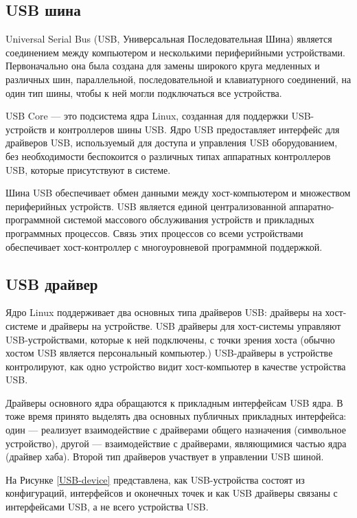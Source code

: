 \subsection{USB шина}
Universal Serial Bus (USB, Универсальная Последовательная Шина) является соединением
между компьютером и несколькими периферийными устройствами. Первоначально она была
создана для замены широкого круга медленных и различных шин, параллельной,
последовательной и клавиатурного соединений, на один тип шины, чтобы к ней могли
подключаться все устройства\cite{Corbet}.\par

USB Core — это подсистема ядра Linux, созданная для поддержки USB-устройств и контроллеров шины USB. Ядро USB предоставляет интерфейс для драйверов USB, используемый для доступа и
управления USB оборудованием, без необходимости беспокоится о различных типах
аппаратных контроллеров USB, которые присутствуют в системе.\par

Шина USB обеспечивает обмен данными между хост-компьютером и множеством периферийных устройств. USB является единой централизованной аппаратно-программной системой массового обслуживания устройств и прикладных программных процессов. Связь этих процессов со всеми устройствами обеспечивает хост-контроллер с многоуровневой программной поддержкой.\par

\subsection{USB драйвер}
Ядро Linux поддерживает два основных типа драйверов USB: драйверы на хост-системе и
драйверы на устройстве. USB драйверы для хост-системы управляют USB-устройствами,
которые к ней подключены, с точки зрения хоста (обычно хостом USB является персональный
компьютер.) USB-драйверы в устройстве контролируют, как одно устройство видит хост-компьютер в качестве устройства USB.\par
Драйверы основного ядра обращаются к прикладным
интерфейсам USB ядра. В тоже время принято выделять два основных
публичных прикладных интерфейса: один --- реализует взаимодействие с
драйверами общего назначения (символьное устройство), другой ---
взаимодействие с драйверами, являющимися частью ядра (драйвер хаба).
Второй тип драйверов участвует в управлении USB шиной.\par
На Рисунке \ref{USB-device} 
представлена, как USB-устройства состоят из конфигураций, интерфейсов и оконечных точек и как USB
драйверы связаны с интерфейсами USB, а не всего устройства USB.

